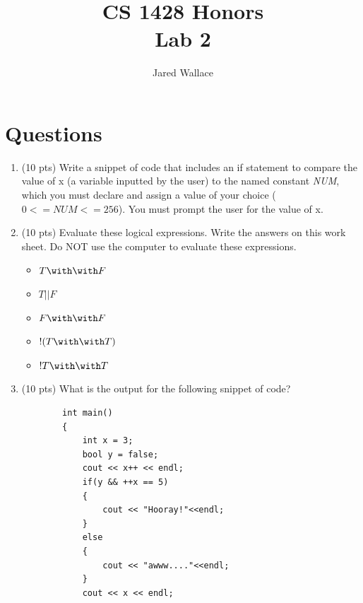 \documentclass[letterpaper,12pt]{article}
\title{\Large CS 1428 Honors\\Lab 2}
\author{Jared Wallace}
\date{}
\begin{document}
\maketitle

\vspace{30mm}

\section*{Questions}

\begin{enumerate}
    \item (10 pts) Write a snippet of code that includes an if statement to compare the value of
        x (a variable inputted by the user) to the named constant \emph{NUM}, which you must declare
          and assign a value of your choice ($0<=NUM<=256$). You must prompt the user for the value of x.
    \vspace{40mm}
    \item (10 pts) Evaluate these logical expressions. Write the answers on this work sheet.
          Do NOT use the computer to evaluate these expressions.
          \begin{itemize}
              \item $T \with \with F$
            \item $T || F$
            \item $F \with \with F$
            \item $!( T \with \with T )$
            \item $!T \with \with T$
          \end{itemize}
    \vspace{30mm}
    \item (10 pts) What is the output for the following snippet of code?
        \begin{lstlisting}
        int main()
        {
            int x = 3;
            bool y = false;
            cout << x++ << endl;
            if(y && ++x == 5)
            {
                cout << "Hooray!"<<endl;
            }
            else
            {
                cout << "awww...."<<endl;
            }
            cout << x << endl;


\end{lstlisting}
\end{enumerate}
\end{document}

